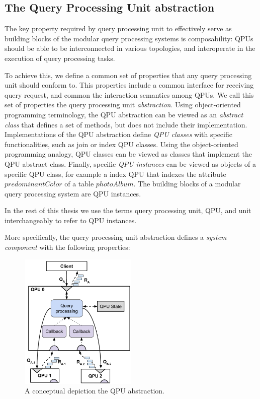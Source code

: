 \subsection{The Query Processing Unit abstraction}

The key property required by query processing unit to effectively serve as building blocks of the modular query
processing systems is composability:
QPUs should be able to be interconnected in various topologies, and interoperate in the execution of query processing tasks.

To achieve this, we define a common set of properties that any query processing unit should conform to.
This properties include a common interface for receiving query request, and common the interaction semantics among QPUs.
We call this set of properties the query processing unit \textit{abstraction}.
Using object-oriented programming terminology, the QPU abstraction can be viewed as an \textit{abstract class}
that defines a set of methods, but does not include their implementation.
Implementations of the QPU abstraction define \textit{QPU classes} with specific functionalities,
such as join or index QPU classes.
Using the object-oriented programming analogy, QPU classes can be viewed as classes that implement the QPU
abstract class.
Finally, specific \textit{QPU instances} can be viewed as objects of a specific QPU class, for example a index QPU that
indexes the attribute $predominantColor$ of a table $photoAlbum$.
The building blocks of a modular query processing system are QPU instances.

In the rest of this thesis we use the terms query processing unit, QPU, and unit interchangeably to refer to QPU instances.

\bigskip

More specifically, the query processing unit abstraction defines a \textit{system component} with the following properties:

\begin{figure}[t]
  \centering
    \includegraphics[width=0.5\textwidth]{./figures/design_pattern/qpu_abstraction.pdf}
  \caption{A conceptual depiction the QPU abstraction.}
  \label{fig:qpu_abstraction}
\end{figure}

